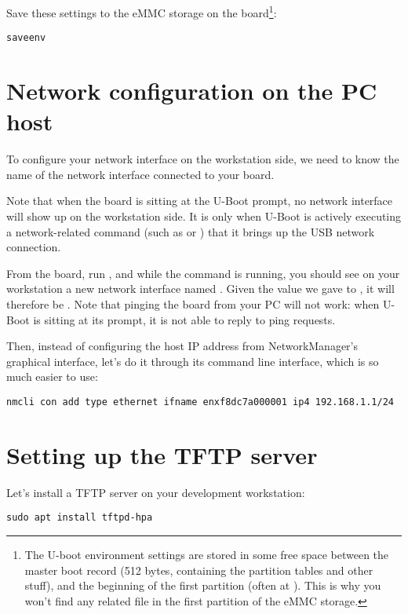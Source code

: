 Save these settings to the eMMC storage on the board\footnote{
The U-boot environment settings are stored in some free space
between the master boot record (512 bytes, containing the partition
tables and other stuff), and the beginning of the first partition (often
at ). This is why you won't find any related file in the
first partition of the eMMC storage.}:

\begin{verbatim}
saveenv
\end{verbatim}

\section{Network configuration on the PC host}

To configure your network interface on the workstation side, we need
to know the name of the network interface connected to your board.

Note that when the board is sitting at the U-Boot prompt, no network
interface will show up on the workstation side. It is only when U-Boot
is actively executing a network-related command (such as 
or ) that it brings up the USB network connection.

From the board, run , and while the 
command is running, you should see on your workstation a new network
interface named . Given the value we gave to
, it will therefore be
. Note that pinging the board from your PC will
not work: when U-Boot is sitting at its prompt, it is not able to
reply to ping requests.

Then, instead of configuring the host IP address from NetworkManager's
graphical interface, let's do it through its command line interface,
which is so much easier to use:

\begin{verbatim}
nmcli con add type ethernet ifname enxf8dc7a000001 ip4 192.168.1.1/24
\end{verbatim}

\section{Setting up the TFTP server}

Let's install a TFTP server on your development workstation:

\begin{verbatim}
sudo apt install tftpd-hpa
\end{verbatim}

